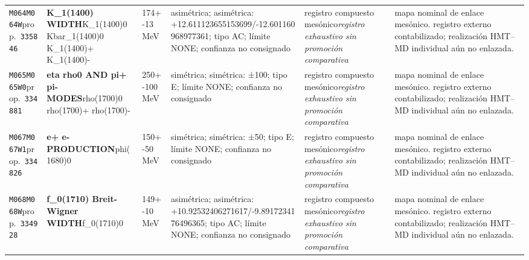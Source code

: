 \begin{landscape}
\begin{longtable}{L{1.85cm}L{4.45cm}L{2.35cm}L{4.05cm}L{3.35cm}L{7.15cm}}
\texttt{M064}\newline \texttt{M064W}\newline prop.\ \texttt{335846} & \textbf{K\_\allowbreak{}1(1400) WIDTH}\newline K\_\allowbreak{}1(1400)0 \textbar{}\allowbreak{} Kbar\_\allowbreak{}1(1400)0 \textbar{}\allowbreak{} K\_\allowbreak{}1(1400)+ \textbar{}\allowbreak{} K\_\allowbreak{}1(1400)- & 174+-13\,MeV & asimétrica; asimétrica: +12.611123655153699/-12.601160968977361; tipo AC; límite NONE; confianza no consignado & registro compuesto mesónico\newline \emph{registro exhaustivo sin promoción comparativa} & mapa nominal de enlace mesónico. registro externo contabilizado; realización HMT--MD individual aún no enlazada. \\
\texttt{M065}\newline \texttt{M065W0}\newline prop.\ \texttt{334881} & \textbf{eta rho0 AND pi+ pi- MODES}\newline rho(1700)0 \textbar{}\allowbreak{} rho(1700)+ \textbar{}\allowbreak{} rho(1700)- & 250+-100\,MeV & simétrica; simétrica: ±100; tipo E; límite NONE; confianza no consignado & registro compuesto mesónico\newline \emph{registro exhaustivo sin promoción comparativa} & mapa nominal de enlace mesónico. registro externo contabilizado; realización HMT--MD individual aún no enlazada. \\
\texttt{M067}\newline \texttt{M067W1}\newline prop.\ \texttt{334826} & \textbf{e+ e- PRODUCTION}\newline phi(1680)0 & 150+-50\,MeV & simétrica; simétrica: ±50; tipo E; límite NONE; confianza no consignado & registro compuesto mesónico\newline \emph{registro exhaustivo sin promoción comparativa} & mapa nominal de enlace mesónico. registro externo contabilizado; realización HMT--MD individual aún no enlazada. \\
\texttt{M068}\newline \texttt{M068W}\newline prop.\ \texttt{334928} & \textbf{f\_\allowbreak{}0(1710) Breit-Wigner WIDTH}\newline f\_\allowbreak{}0(1710)0 & 149+-10\,MeV & asimétrica; asimétrica: +10.92532406271617/-9.8917234176496365; tipo AC; límite NONE; confianza no consignado & registro compuesto mesónico\newline \emph{registro exhaustivo sin promoción comparativa} & mapa nominal de enlace mesónico. registro externo contabilizado; realización HMT--MD individual aún no enlazada. \\

\end{longtable}
\end{landscape}
